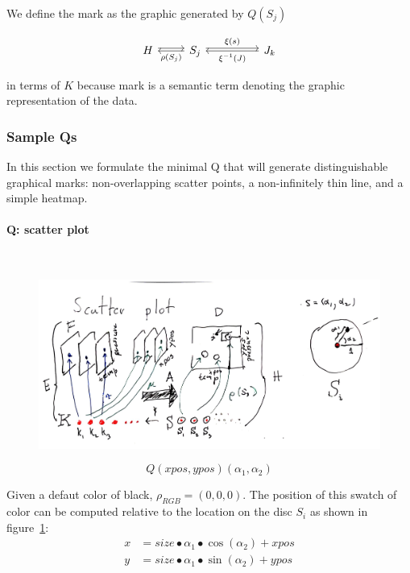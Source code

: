 \documentclass[../main.tex]{subfiles}
\begin{document}
We define the mark as the graphic generated by $Q(S_j)$

\begin{equation}
    \begin{tikzcd}
        H \arrow[r, shift left] & S_j \arrow[rr, "\xi(s)", shift left] \arrow[l, "\rho(S_j)"] &  & J_{k} \arrow[ll, "\xi^{-1}(J)"]
        \end{tikzcd}
    \label{eq:mark}
\end{equation}

in terms of $K$ because mark is a semantic term denoting the graphic representation of the data.

\subsubsection{Sample Qs}
In this section we formulate the minimal Q that will generate distinguishable graphical marks: non-overlapping scatter points, a non-infinitely thin line, and a simple heatmap. 

\paragraph{Q: scatter plot}\mbox{} \\
\label{sec:artist_example_scatter}
\begin{figure}[H]
    \includegraphics[width=\textwidth]{figures/math/scatter.png}
    \label{fig:artist_scatter}
\end{figure}

\begin{equation}
Q(xpos, ypos)(\alpha_{1}, \alpha_{2}) 
\end{equation}

Given a defaut color of black, $\rho_{RGB} = (0,0,0)$. The position of this swatch of color can be computed relative to the location on the disc $S_{i}$ as shown in figure~\ref{fig:artist_scatter}:
\begin{align}
x &= size\bullet \alpha_1 \bullet \cos(\alpha_2) + xpos\\
y &= size\bullet \alpha_1 \bullet \sin(\alpha_2) + ypos
\end{align}
\end{document}

